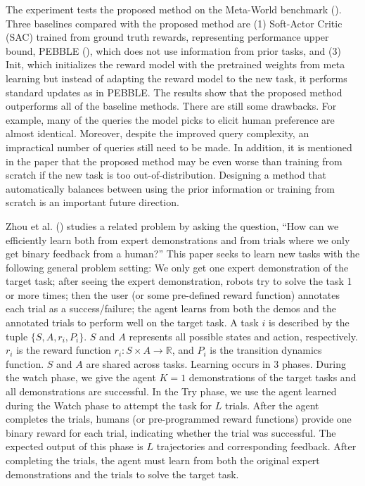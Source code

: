 \documentclass[
  letterpaper,
  numbers=noenddot,
  DIV=11]{scrreprt}
\theoremstyle{plain}
\theoremstyle{definition}
\theoremstyle{plain}
\theoremstyle{remark}
\begin{document}
The experiment tests the proposed method on the Meta-World benchmark
(). Three baselines compared
with the proposed method are (1) Soft-Actor Critic (SAC) trained from
ground truth rewards, representing performance upper bound, PEBBLE
(), which does
not use information from prior tasks, and (3) Init, which initializes
the reward model with the pretrained weights from meta learning but
instead of adapting the reward model to the new task, it performs
standard updates as in PEBBLE. The results show that the proposed method
outperforms all of the baseline methods. There are still some drawbacks.
For example, many of the queries the model picks to elicit human
preference are almost identical. Moreover, despite the improved query
complexity, an impractical number of queries still need to be made. In
addition, it is mentioned in the paper that the proposed method may be
even worse than training from scratch if the new task is too
out-of-distribution. Designing a method that automatically balances
between using the prior information or training from scratch is an
important future direction.

Zhou et al. () studies a related
problem by asking the question, ``How can we efficiently learn both from
expert demonstrations and from trials where we only get binary feedback
from a human?'' This paper seeks to learn new tasks with the following
general problem setting: We only get one expert demonstration of the
target task; after seeing the expert demonstration, robots try to solve
the task 1 or more times; then the user (or some pre-defined reward
function) annotates each trial as a success/failure; the agent learns
from both the demos and the annotated trials to perform well on the
target task. A task \(i\) is described by the tuple
\(\{S, A, r_i, P_i\}\). \(S\) and \(A\) represents all possible states
and action, respectively. \(r_i\) is the reward function
\(r_i : S \times A \to \mathbb{R}\), and \(P_i\) is the transition
dynamics function. \(S\) and \(A\) are shared across tasks. Learning
occurs in 3 phases. During the watch phase, we give the agent \(K=1\)
demonstrations of the target tasks and all demonstrations are
successful. In the Try phase, we use the agent learned during the Watch
phase to attempt the task for \(L\) trials. After the agent completes
the trials, humans (or pre-programmed reward functions) provide one
binary reward for each trial, indicating whether the trial was
successful. The expected output of this phase is \(L\) trajectories and
corresponding feedback. After completing the trials, the agent must
learn from both the original expert demonstrations and the trials to
solve the target task.
\end{document}
